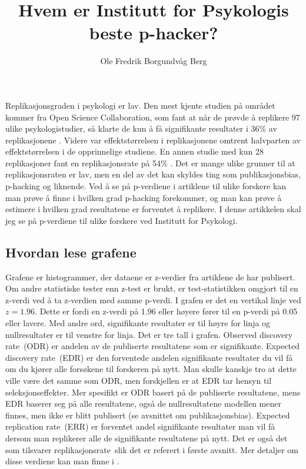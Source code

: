 \documentclass[doc,norsk]{apa7}
\title{Hvem er Institutt for Psykologis beste p-hacker?}
\author{Ole Fredrik Borgundvåg Berg}
\affiliation{NTNU}
\begin{document}
\maketitle

Replikasjonsgraden i psykologi er lav. Den mest kjente studien på området kommer fra Open Science Collaboration, som fant at når de prøvde å replikere 97 ulike psykologistudier, så klarte de kun å få signifikante resultater i 36\% av replikasjonene \parencite{open-replikasjon}. Videre var effektstørrelsen i replikasjonene omtrent halvparten av effektstørrelsen i de opprinnelige studiene. En annen studie med kun 28 replikasjoner fant en replikasjonsrate på 54\% \parencite{replikasjonsrate-2}. Det er mange ulike grunner til at replikasjonsraten er lav, men en del av det kan skyldes ting som publikasjonsbias, p-hacking og liknende. Ved å se på p-verdiene i artiklene til ulike forskere kan man prøve å finne i hvilken grad p-hacking forekommer, og man kan prøve å estimere i hvilken grad resultatene er forventet å replikere. I denne artikkelen skal jeg se på p-verdiene til ulike forskere ved Institutt for Psykologi. 

\subsection{Hvordan lese grafene}
Grafene er histogrammer, der dataene er z-verdier fra artiklene de har publisert. Om andre statistiske tester enn z-test er brukt, er test-statistikken omgjort til en z-verdi ved å ta z-verdien med samme p-verdi. I grafen er det en vertikal linje ved $z=1.96$. Dette er fordi en z-verdi på 1.96 eller høyere fører til en p-verdi på 0.05 eller lavere. Med andre ord, signifikante resultater er til høyre for linja og nullresultater er til venstre for linja. Det er tre tall i grafen. \guillemetleft Observed discovery rate\guillemetright\ (ODR) er andelen av de publiserte resultatene som er signifikante. \guillemetleft Expected discovery rate\guillemetright\ (EDR) er den forventede andelen signifikante resultater du vil få om du kjører alle forsøkene til forskeren på nytt. Man skulle kanskje tro at dette ville være det samme som ODR, men forskjellen er at EDR tar hensyn til seleksjonseffekter. Mer spesifikt er ODR basert på de publiserte resultatene, mens EDR baserer seg på alle resultatene, også de nullresultatene modellen mener finnes, men ikke er blitt publisert (se avsnittet om publikasjonsbias). \guillemotleft Expected replication rate\guillemetright\ (ERR) er forventet andel signifikante resultater man vil få dersom man replikerer alle de signifikante resultatene på nytt. Det er også det som tilsvarer \guillemetleft replikasjonsrate\guillemetright\ slik det er referert i første avsnitt. Mer detaljer om disse verdiene kan man finne i \textcite{z-curve-implementasjon}.
\end{document}
